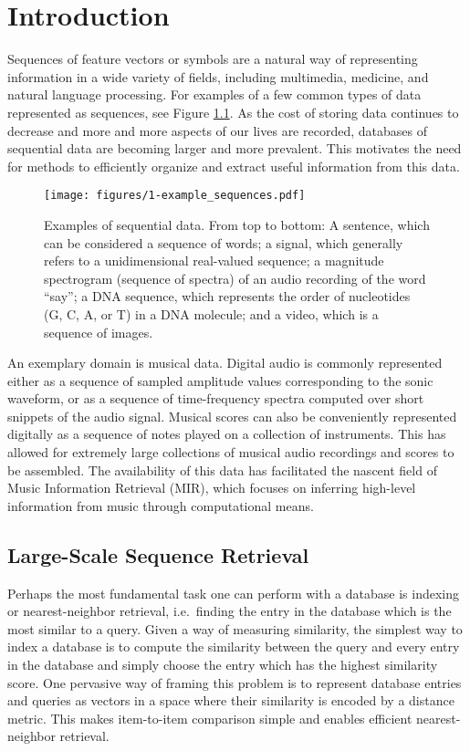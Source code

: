\chapter{Introduction}

Sequences of feature vectors or symbols are a natural way of representing information in a wide variety of fields, including multimedia, medicine, and natural language processing.
For examples of a few common types of data represented as sequences, see Figure \ref{fig:example_sequences}.
As the cost of storing data continues to decrease and more and more aspects of our lives are recorded, databases of sequential data are becoming larger and more prevalent.
This motivates the need for methods to efficiently organize and extract useful information from this data.

\begin{figure}
  \texttt{[image: figures/1-example\_sequences.pdf]}
  \caption[Examples of sequential data]{Examples of sequential data.  From top to bottom: A sentence, which can be considered a sequence of words; a signal, which generally refers to a unidimensional real-valued sequence; a magnitude spectrogram (sequence of spectra) of an audio recording of the word ``say''; a DNA sequence, which represents the order of nucleotides (G, C, A, or T) in a DNA molecule; and a video, which is a sequence of images.}
  \label{fig:example_sequences}
\end{figure}

An exemplary domain is musical data.
Digital audio is commonly represented either as a sequence of sampled amplitude values corresponding to the sonic waveform, or as a sequence of time-frequency spectra computed over short snippets of the audio signal.
Musical scores can also be conveniently represented digitally as a sequence of notes played on a collection of instruments.
This has allowed for extremely large collections of musical audio recordings and scores to be assembled.
The availability of this data has facilitated the nascent field of Music Information Retrieval (MIR), which focuses on inferring high-level information from music through computational means.

\cite{}

\section{Large-Scale Sequence Retrieval}

Perhaps the most fundamental task one can perform with a database is indexing or nearest-neighbor retrieval, i.e.\ finding the entry in the database which is the most similar to a query.
Given a way of measuring similarity, the simplest way to index a database is to compute the similarity between the query and every entry in the database and simply choose the entry which has the highest similarity score.
One pervasive way of framing this problem is to represent database entries and queries as vectors in a space where their similarity is encoded by a distance metric.
This makes item-to-item comparison simple and enables efficient nearest-neighbor retrieval.

